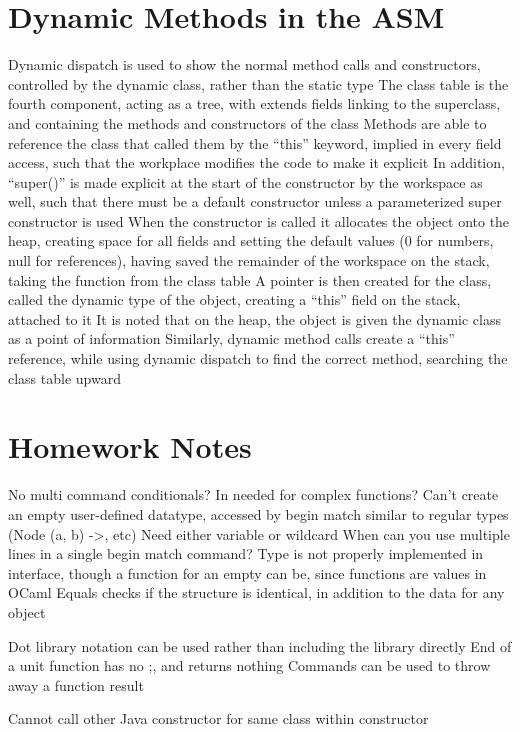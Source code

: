 \documentclass[11 pt, twoside]{article}
\newenvironment{outline*}
{
	\begin{outline}[enumerate]
	}
	{\end{outline}
}
\begin{document}
\section{Dynamic Methods in the ASM}
\begin{outline*}
\1 Dynamic dispatch is used to show the normal method calls and constructors, controlled by the dynamic class, rather than the static type
	\2 The class table is the fourth component, acting as a tree, with extends fields linking to the superclass, and containing the methods and constructors of the class
		\3 Methods are able to reference the class that called them by the ``this'' keyword, implied in every field access, such that the workplace modifies the code to make it explicit
		\3 In addition, ``super()'' is made explicit at the start of the constructor by the workspace as well, such that there must be a default constructor unless a parameterized super constructor is used
	\2 When the constructor is called it allocates the object onto the heap, creating space for all fields and setting the default values (0 for numbers, null for references), having saved the remainder of the workspace on the stack, taking the function from the class table
		\3 A pointer is then created for the class, called the dynamic type of the object, creating a ``this'' field on the stack, attached to it
		\3 It is noted that on the heap, the object is given the dynamic class as a point of information
	\2 Similarly, dynamic method calls create a ``this'' reference, while using dynamic dispatch to find the correct method, searching the class table upward
\end{outline*}
\section{Homework Notes}
\begin{outline*}
\1 No multi command conditionals?
\1 In needed for complex functions?
\1 Can't create an empty user-defined datatype, accessed by begin match similar to regular types (Node (a, b) ->, etc)
\1 Need either variable or wildcard
\1 When can you use multiple lines in a single begin match command?
\1 Type is not properly implemented in interface, though a function for an empty can be, since functions are values in OCaml
\1 Equals checks if the structure is identical, in addition to the data for any object

\1 Dot library notation can be used rather than including the library directly
\1 End of a unit function has no ;, and returns nothing
\1 Commands can be used to throw away a function result

\1 Cannot call other Java constructor for same class within constructor
\end{outline*}
\end{document}

